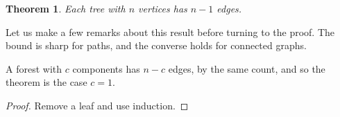 \documentclass{amsart}
\newtheorem{thm}{Theorem}
\begin{document}
\begin{thm} Each tree with $n$ vertices has $n-1$ edges. \end{thm}

Let us make a few remarks about this result before turning to the proof. The
bound is sharp for paths, and the converse holds for connected graphs.

A forest with $c$ components has $n-c$ edges, by the same count, and so the
theorem is the case $c=1$.

\begin{proof} Remove a leaf and use induction. \end{proof}
\end{document}
